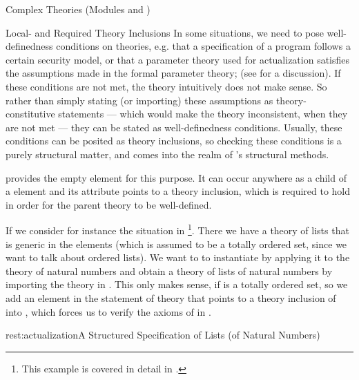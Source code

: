 \begin{tchapter}[id=complex-theories,short=Complex Theories]{Complex Theories (Modules
    {} and {})}
\begin{tsection}[id=restricting-inference,short=Local/Required Theory Inclusions]{Local- and Required Theory Inclusions}
  In some situations, we need to pose well-definedness conditions on theories,
  e.g. that a specification of a program follows a certain security model, or that
  a parameter theory used for actualization satisfies the assumptions made in the
  formal parameter theory; (see {} for a discussion). If these
  conditions are not met, the theory intuitively does not make sense. So rather
  than simply stating (or importing) these assumptions as theory-constitutive
  statements --- which would make the theory inconsistent, when they are not met
  --- they can be stated as well-definedness conditions. Usually, these conditions
  can be posited as theory inclusions, so checking these conditions is a purely
  structural matter, and comes into the realm of {\omdoc}'s structural methods.

  {\omdoc} provides the empty {} element for this purpose. It can
  occur anywhere as a child of a {} element and its
  {} attribute points to a theory inclusion, which is
  required to hold in order for the parent theory to be well-defined.
  
  If we consider for instance the situation in
  {}\footnote{This example is covered in detail in
    {}.}.  There we have a theory {} of lists that is
  generic in the elements (which is assumed to be a totally ordered set, since we want to
  talk about ordered lists). We want to to instantiate {} by applying it
  to the theory {} of natural numbers and obtain a theory
  {} of lists of natural numbers by importing the theory
  {} in {}. This only makes sense, if
  {} is a totally ordered set, so we add an {} element
  in the statement of theory {} that points to a theory inclusion of
  {} into {}, which forces us to verify the axioms of
  {} in {}.

\begin{myfig}{rest:actualization}{A Structured Specification of Lists (of
    Natural Numbers)}
  \begin{tikzpicture}\end{tikzpicture}\quad
\end{myfig}


\end{tsection}
\end{tchapter}

